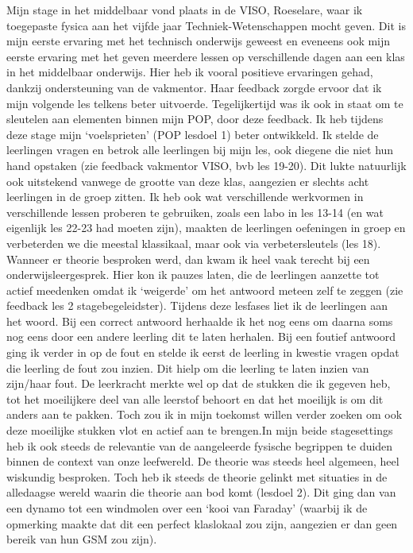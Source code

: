 \documentclass[a4paper,12pt,twoside]{article}%
\begin{document}
Mijn stage in het middelbaar vond plaats in de VISO, Roeselare, waar ik toegepaste fysica aan het vijfde jaar Techniek-Wetenschappen mocht geven. Dit is mijn eerste ervaring met het technisch onderwijs geweest en eveneens ook mijn eerste ervaring met het geven meerdere lessen op verschillende dagen aan een klas in het middelbaar onderwijs. Hier heb ik vooral positieve ervaringen gehad, dankzij ondersteuning van de vakmentor. Haar feedback zorgde ervoor dat ik mijn volgende les telkens beter uitvoerde. Tegelijkertijd was ik ook in staat om te sleutelen aan elementen binnen mijn POP, door deze feedback. Ik heb tijdens deze stage mijn `voelsprieten' (POP lesdoel 1) beter ontwikkeld. Ik stelde de leerlingen vragen en betrok alle leerlingen bij mijn les, ook diegene die niet hun hand opstaken (zie feedback vakmentor VISO, bvb les 19-20). Dit lukte natuurlijk ook uitstekend vanwege de grootte van deze klas, aangezien er slechts acht leerlingen in de groep zitten. Ik heb ook wat verschillende werkvormen in verschillende lessen proberen te gebruiken, zoals een labo in les 13-14 (en wat eigenlijk les 22-23 had moeten zijn), maakten de leerlingen oefeningen in groep en verbeterden we die meestal klassikaal, maar ook via verbetersleutels (les 18). Wanneer er theorie besproken werd, dan kwam ik heel vaak terecht bij een onderwijsleergesprek. Hier kon ik pauzes laten, die de leerlingen aanzette tot actief meedenken omdat ik `weigerde' om het antwoord meteen zelf te zeggen (zie feedback les 2 stagebegeleidster). Tijdens deze lesfases liet ik de leerlingen aan het woord. Bij een correct antwoord herhaalde ik het nog eens om daarna soms nog eens door een andere leerling dit te laten herhalen. Bij een foutief antwoord ging ik verder in op de fout en stelde ik eerst de leerling in kwestie vragen opdat die leerling de fout zou inzien. Dit hielp om die leerling te laten inzien van zijn/haar fout. De leerkracht merkte wel op dat de stukken die ik gegeven heb, tot het moeilijkere deel van alle leerstof behoort en dat het moeilijk is om dit anders aan te pakken. Toch zou ik in mijn toekomst willen verder zoeken om ook deze moeilijke stukken vlot en actief aan te brengen.\newline In mijn beide stagesettings heb ik ook steeds de relevantie van de aangeleerde fysische begrippen te duiden binnen de context van onze leefwereld. De theorie was steeds heel algemeen, heel wiskundig besproken. Toch heb ik steeds de theorie gelinkt met situaties in de alledaagse wereld waarin die theorie aan bod komt (lesdoel 2). Dit ging dan van een dynamo tot een windmolen over een `kooi van Faraday' (waarbij ik de opmerking maakte dat dit een perfect klaslokaal zou zijn, aangezien er dan geen bereik van hun GSM zou zijn).  \newline
\end{document}
